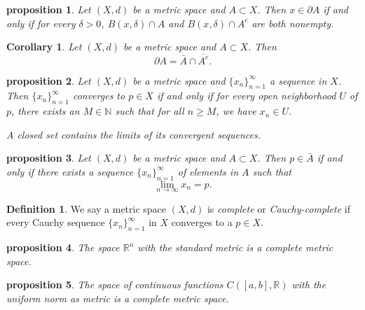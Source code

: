 \documentclass{article}
\newtheorem{corollary}{Corollary}[section]
\newtheorem{proposition}{Proposition}[section]
\newtheorem{proposition}{proposition}[section]
\theoremstyle{definition}
\newtheorem{definition}{Definition}[section]
\theoremstyle{remark}
\begin{document}
\begin{proposition} \label{prop:boundary_characterization}
Let \( (X, d) \) be a metric space and \( A \subset X \). Then \( x \in \partial A \) if and only if for every \( \delta > 0 \), \( B(x, \delta) \cap A \) and \( B(x, \delta) \cap A^c \) are both nonempty.
\end{proposition}

\begin{corollary} \label{cor:boundary_closure}
Let \( (X, d) \) be a metric space and \( A \subset X \). Then
\[
\partial A = \bar{A} \cap \overline{A^c}.
\]
\end{corollary}

\begin{proposition} \label{prop:sequence_convergence}
Let \( (X, d) \) be a metric space and \( \{ x_n \}_{n=1}^{\infty} \) a sequence in \( X \). Then \( \{ x_n \}_{n=1}^{\infty} \) converges to \( p \in X \) if and only if for every open neighborhood \( U \) of \( p \), there exists an \( M \in \mathbb{N} \) such that for all \( n \geq M \), we have \( x_n \in U \).

A closed set contains the limits of its convergent sequences.
\end{proposition}

\begin{proposition} \label{prop:sequence_closure}
Let \( (X, d) \) be a metric space and \( A \subset X \). Then \( p \in \bar{A} \) if and only if there exists a sequence \( \{ x_n \}_{n=1}^{\infty} \) of elements in \( A \) such that
\[
\lim_{n \to \infty} x_n = p.
\]
\end{proposition}


\begin{definition} \label{def:complete_space}
We say a metric space \( (X, d) \) is \textit{complete} or \textit{Cauchy-complete} if every Cauchy sequence \( \{x_n\}_{n=1}^{\infty} \) in \( X \) converges to a \( p \in X \).
\end{definition}

\begin{proposition} \label{prop:complete_Rn}
The space \( \mathbb{R}^n \) with the standard metric is a complete metric space.
\end{proposition}

\begin{proposition} \label{prop:complete_function_space}
The space of continuous functions \( C([a,b], \mathbb{R}) \) with the uniform norm as metric is a complete metric space.
\end{proposition}
\end{document}
